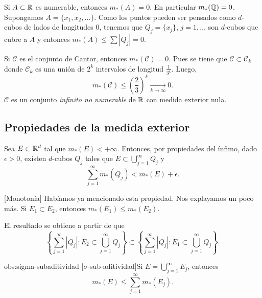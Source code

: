     



    
        \begin{ejemplo}{} Si $A\subset \mathbb{R}$ es numerable, entonces $m_*(A)=0$. En particular $m_{*}(\mathbb{Q})=0$. Supongamos $A=\{x_1,x_2,\ldots\}$. Como los puntos pueden ser pensados  como $d$-cubos de lados de longitudes $0$, tenemos que $Q_j=\{x_j\}$, $j=1,\ldots$ son $d$-cubos que cubre a $A$ y entonces $m_*(A)\leq\sum |Q_j|=0$. 
    \end{ejemplo}
    
    \begin{ejemplo}{}
    Si $\mathscr{C}$ es el conjunto de Cantor, entonces $m_{*}(\mathscr{C})=0$.
Pues se tiene que $\mathscr{C}\subset \mathscr{C}_k$ donde $\mathscr{C}_k$ es una uni\'on de $2^k$ intervalos de longitud $\frac{1}{3^k}$.
    Luego, 
    \[
    m_{*}(\mathscr{C})\leq \left(\frac{2}{3}\right)^k \xrightarrow[k \to \infty]{}0.
    \]
    $\mathscr{C}$ es un  conjunto \emph{infinito no numerable} de $\mathbb{R}$     con medida exterior nula.
    \end{ejemplo}
    



    
    \subsection{Propiedades de la medida exterior}
    
    \begin{observacion}{}
    Sea $E \subset \mathbb{R}^d$ tal que  $m_*(E)<+\infty$. 
    Entonces, por propiedades del ínfimo,  dado $\epsilon>0$, existen $d$-cubos $Q_j$  tales que $E \subset \bigcup\limits_{j=1}^{\infty} Q_j$ y
    \[
    \sum\limits_{j=1}^{\infty} m_{*}(Q_j)< m_{*}(E)+\epsilon.
    \]
 
    \end{observacion}

    \begin{observacion}{}[Monoton\'ia] Habíamos ya mencionado esta propiedad. Nos explayamos un poco más. 
    Si $E_1\subset E_2$, entonces $m_{*}(E_1)\leq m_{*}(E_2)$.
    
    El resultado se obtiene a partir de que 
    \[
   \left \{ \sum\limits_{j=1}^{\infty} |Q_j|: E_2\subset \bigcup\limits_{j=1}^{\infty} Q_j
    \right\}
    \subset
     \left\{ \sum\limits_{j=1}^{\infty} |Q_j|: E_1\subset \bigcup\limits_{j=1}^{\infty} Q_j
    \right\}.
    \]
    \end{observacion}
    \begin{proposicion}{obs:sigma-subaditividad} [$\sigma$-sub-aditividad]Si $E=\bigcup\limits_{j=1}^{\infty} E_j$, entonces
    \[m_{*}(E)\leq \sum\limits_{j=1}^{\infty} m_{*}(E_j).\]
\end{proposicion}




